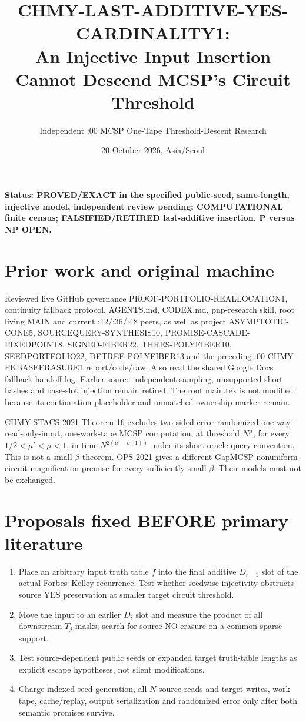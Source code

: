 \documentclass[11pt]{article}
\title{CHMY-LAST-ADDITIVE-YES-CARDINALITY1:\\An Injective Input Insertion Cannot Descend MCSP's Circuit Threshold}
\author{Independent :00 MCSP One-Tape Threshold-Descent Research}
\date{20 October 2026, Asia/Seoul}
\begin{document}
\maketitle
\noindent\textbf{Status: PROVED/EXACT in the specified public-seed, same-length, injective model, independent review pending; COMPUTATIONAL finite census; FALSIFIED/RETIRED last-additive insertion. P versus NP OPEN.}

\section*{Prior work and original machine}
Reviewed live GitHub governance PROOF-PORTFOLIO-REALLOCATION1, continuity fallback protocol, AGENTS.md, CODEX.md, pnp-research skill, root living MAIN and current :12/:36/:48 peers, as well as project ASYMPTOTIC-CONE5, SOURCEQUERY-SYNTHESIS10, PROMISE-CASCADE-FIXEDPOINT8, SIGNED-FIBER22, THRES-POLYFIBER10, SEEDPORTFOLIO22, DETREE-POLYFIBER13 and the preceding :00 CHMY-FKBASEERASURE1 report/code/raw. Also read the shared Google Docs fallback handoff log. Earlier source-independent sampling, unsupported short hashes and base-slot injection remain retired. The root main.tex is not modified because its continuation placeholder and unmatched ownership marker remain.

CHMY STACS 2021 Theorem 16 excludes two-sided-error randomized one-way-read-only-input, one-work-tape MCSP computation, at threshold $N^\mu$, for every $1/2<\mu'<\mu<1$, in time $N^{2(\mu'-o(1))}$ under its short-oracle-query convention. This is not a small-$\beta$ theorem. OPS 2021 gives a different GapMCSP nonuniform-circuit magnification premise for every sufficiently small $\beta$. Their models must not be exchanged.

\section*{Proposals fixed BEFORE primary literature}
\begin{enumerate}
\item Place an arbitrary input truth table $f$ into the final additive $D_{r-1}$ slot of the actual Forbes--Kelley recurrence. Test whether seedwise injectivity obstructs source YES preservation at smaller target circuit threshold.
\item Move the input to an earlier $D_i$ slot and measure the product of all downstream $T_j$ masks; search for source-NO erasure on a common sparse support.
\item Test source-dependent public seeds or expanded target truth-table lengths as explicit escape hypotheses, not silent modifications.
\item Charge indexed seed generation, all $N$ source reads and target writes, work tape, cache/replay, output serialization and randomized error only after both semantic promises survive.
\end{enumerate}
\end{document}
